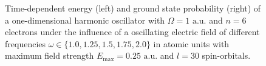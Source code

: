 \begin{figure}[!h]
    \centering
    \caption{Time-dependent energy (left) and ground state probability (right)
        of a one-dimensional harmonic oscillator with $\Omega=1 \text{ a.u.}$
        and $n=6$ electrons under the influence of a oscillating electric field 
        of different frequencies $\omega\in\{1.0, 1.25, 1.5, 1.75, 2.0\}$ in atomic units
        with maximum field strength $E_\text{max}=0.25 \text{ a.u.}$ and $l=30$ 
        spin-orbitals.
    }
    \label{fig:1d_n6_qd_resonance}
\end{figure}


